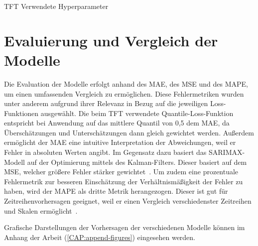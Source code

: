 \begin{table}[t]
 \centering\small
 \caption{TFT Verwendete Hyperparameter}
 \label{TAB:hyperparameter-used}
 
\end{table}

\section{Evaluierung und Vergleich der Modelle}
Die Evaluation der Modelle erfolgt anhand des \ac{MAE}, des \ac{MSE} und des \ac{MAPE}, um einen umfassenden Vergleich zu ermöglichen.
Diese Fehlermetriken wurden unter anderem aufgrund ihrer Relevanz in Bezug auf die jeweiligen Loss-Funktionen ausgewählt.
Die beim \ac{TFT} verwendete Quantile-Loss-Funktion entspricht bei Anwendung auf das mittlere Quantil von 0,5 dem \ac{MAE}, da Überschätzungen und Unterschätzungen dann gleich gewichtet werden.
Außerdem ermöglicht der \ac{MAE} eine intuitive Interpretation der Abweichungen, weil er Fehler in absoluten Werten angibt.
Im Gegensatz dazu basiert das \ac{SARIMAX}-Modell auf der Optimierung mittels des Kalman-Filters.
Dieser basiert auf dem \ac{MSE}, welcher größere Fehler stärker gewichtet~\cite{Lacey.1998}.
Um zudem eine prozentuale Fehlermetrik zur besseren Einschätzung der Verhältnismäßigkeit der Fehler zu haben, wird der \ac{MAPE} als dritte Metrik herangezogen.
Dieser ist gut für Zeitreihenvorhersagen geeignet, weil er einen Vergleich verschiedenster Zeitreihen und Skalen ermöglicht~\cite{Lazzeri.2021}.

Grafische Darstellungen der Vorhersagen der verschiedenen Modelle können im Anhang der Arbeit (\ref{CAP:append-figures}) eingesehen werden.

